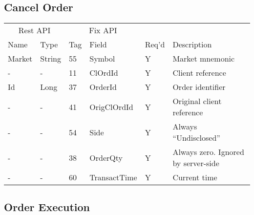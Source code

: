 \documentclass[12pt,a4paper,notitlepage,bibliography=totoc]{scrreprt}
\begin{document}
\begin{appendices}
\subsection{Cancel Order}

\vspace{5mm}
\begin{tabular}{ll|ll|ll}
\multicolumn{2}{c}{Rest API}&\multicolumn{2}{c}{Fix API}\\
Name&Type&Tag&Field&Req'd&Description\\
\hline
Market&String&55&Symbol&Y&Market mnemonic\\
-&-&11&ClOrdId&Y&Client reference\\
Id&Long&37&OrderId&Y&Order identifier\\
-&-&41&OrigClOrdId&Y&Original client reference\\
-&-&54&Side&Y&Always ``Undisclosed''\\
-&-&38&OrderQty&Y&Always zero. Ignored by server-side\\
-&-&60&TransactTime&Y&Current time\\
\end{tabular}
\vspace{5mm}

\subsection{Order Execution}


\end{appendices}
\end{document}
